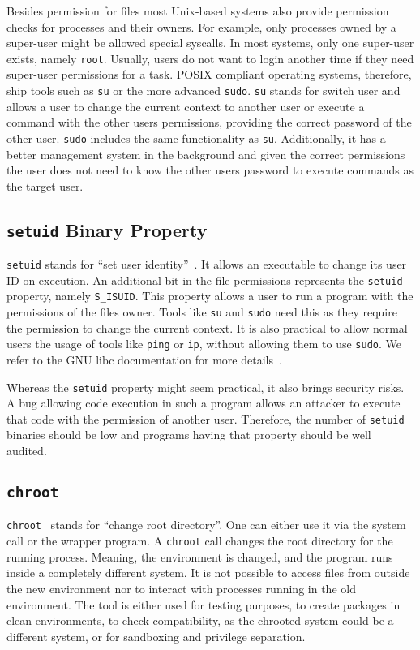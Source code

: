 Besides permission for files most Unix-based systems also provide permission
checks for processes and their owners. For example, only processes owned by a
super-user might be allowed special syscalls. In most systems, only one
super-user exists, namely \texttt{root}. Usually, users do not want to login
another time if they need super-user permissions for a task. POSIX compliant
operating systems, therefore, ship tools such as \texttt{su} or the more
advanced \texttt{sudo}. \texttt{su} stands for switch user and allows a user to
change the current context to another user or execute a command with the other
user\textquotesingle s permissions, providing the correct password of the other
user. \texttt{sudo} includes the same functionality as \texttt{su}.
Additionally, it has a better management system in the background and given the
correct permissions the user does not need to know the other
user\textquotesingle s password to execute commands as the target user.

\subsection{\texttt{setuid} Binary Property}

\texttt{setuid} stands for ``set user identity''~\cite{ogroupsetuid}. It allows
an executable to change its user ID on execution. An additional bit in the file
permissions represents the \texttt{setuid} property, namely \texttt{S\_ISUID}.
This property allows a user to run a program with the permissions of the
file\textquotesingle s owner. Tools like \texttt{su} and \texttt{sudo} need this
as they require the permission to change the current context. It is also
practical to allow normal users the usage of tools like \texttt{ping} or
\texttt{ip}, without allowing them to use \texttt{sudo}. We refer to the GNU
libc documentation for more details~\cite{libcpermission}.

Whereas the \texttt{setuid} property might seem practical, it also brings
security risks. A bug allowing code execution in such a program allows an
attacker to execute that code with the permission of another user. Therefore,
the number of \texttt{setuid} binaries should be low and programs having that
property should be well audited.

\subsection{\texttt{chroot}}

\texttt{chroot}~\cite{ogroupchroot} stands for ``change root directory''. One
can either use it via the system call or the wrapper program. A \texttt{chroot}
call changes the root directory for the running process. Meaning, the
environment is changed, and the program runs inside a completely different
system. It is not possible to access files from outside the new environment nor
to interact with processes running in the old environment. The tool is either
used for testing purposes, to create packages in clean environments, to check
compatibility, as the chrooted system could be a different system, or for
sandboxing and privilege separation. 

